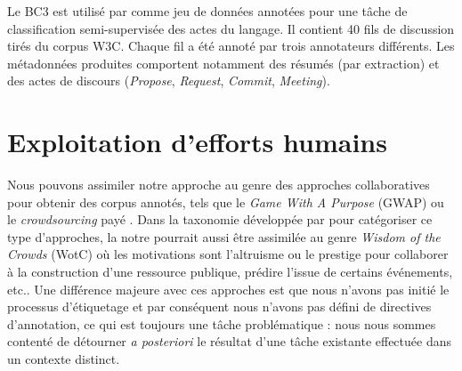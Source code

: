 Le BC3 est utilisé par \cite{joty:2013:sigdial} comme jeu de données annotées pour une tâche de classification semi-supervisée des actes du langage. Il contient 40 fils de discussion tirés du corpus W3C. Chaque fil a été annoté par trois annotateurs différents. Les métadonnées produites comportent notamment des résumés (par extraction) et des actes de discours (\textit{Propose}, \textit{Request}, \textit{Commit}, \textit{Meeting}).

\section{Exploitation d'efforts humains}

Nous pouvons assimiler notre approche au genre des approches collaboratives pour obtenir des corpus annotés, tels que le \textit{Game With A Purpose} (GWAP) \cite{ahn:2006:computer} ou le \textit{crowdsourcing} payé \cite{fort:2011:cl}. Dans la taxonomie développée par \cite{wang:2013:lre} pour catégoriser ce type d'approches, la notre pourrait aussi être assimilée au genre \textit{Wisdom of the Crowds} (WotC) où les motivations sont l'altruisme ou le prestige pour collaborer à la construction d'une ressource publique, prédire l'issue de certains événements, etc..  Une différence majeure avec ces approches est que nous n'avons pas initié le processus d'étiquetage et par conséquent nous n'avons pas défini de directives d'annotation, ce qui est toujours une tâche problématique : nous nous sommes contenté de détourner \textit{a posteriori} le résultat d'une tâche existante effectuée dans un contexte distinct.